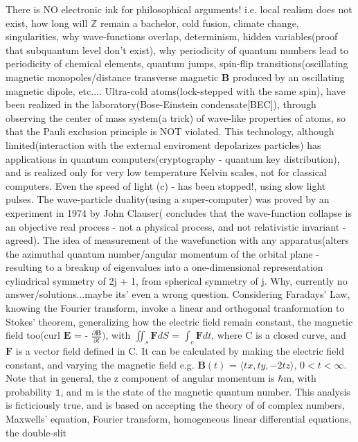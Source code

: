 \documentclass[10pt,fancy]{elegantbook}
\begin{document}
There is NO electronic ink for philosophical arguments! i.e. local realism does not exist, 
how long will $\mathbb Z$ remain a bachelor, cold fusion, climate change, singularities, why wave-functions overlap, determinism, 
hidden variables(proof that subquantum level don't exist), why periodicity of quantum numbers lead to periodicity of chemical elements, quantum jumps, spin-flip transitions(oscillating magnetic monopoles/distance transverse magnetic $\mathbf B$ produced by an oscillating magnetic dipole, etc.... 
Ultra-cold atoms(lock-stepped with the same spin), 
have been realized in the laboratory(Bose-Einstein condensate[BEC]), 
through observing the center of mass system(a trick) of wave-like
properties of atoms, so that the Pauli exclusion principle is NOT violated. 
This technology, although limited(interaction with the external enviroment depolarizes particles) has applications
in quantum computers(cryptography - quantum key distribution), 
and is realized only for very low temperature Kelvin scales, not for classical computers. 
Even the speed of light (c) - has been stopped!, using slow light pulses. 
The wave-particle duality(using a super-computer) was proved by an experiment in 1974 by 
John Clauser( concludes that the wave-function collapse is an objective real process - not a physical process, 
and not relativistic invariant - agreed). The idea of measurement of the wavefunction with any apparatus(alters the azimuthal quantum number/angular momentum of the orbital plane - resulting to
a breakup of eigenvalues into a one-dimensional representation cylindrical symmetry of 2j + 1, from spherical symmetry of j.                  
Why, currently no answer/solutions...maybe its' even a wrong question. Considering Faradays' Law, knowing
the Fourier transform, invoke a linear and orthogonal tranformation to Stokes' theorem, generalizing how the electric field remain constant,
the magnetic field too(curl $\mathbf E$ = - $\frac{\partial \mathbf B}{\partial t})$, with $\iint_s \mathbf F dS$ = $\int_c \mathbf F dt$,
where C is a closed curve, and $\mathbf F$ is a vector field defined in C. It can be calculated by making the electric field constant, 
and varying the magnetic field e.g.
$\mathbf B(t)$ = $\langle tx, ty, -2tz \rangle$, $0<t<\infty$. Note that in general, the z component of angular momentum is $\hbar$m, with probability $\mathbb 1$, and m is the state of the magnetic quantum number.                 
This analysis is ficticiously true, and is based on accepting the theory of
of complex numbers, Maxwells' equation, Fourier transform, homogeneous linear differential equations, the double-slit
\end{document}
